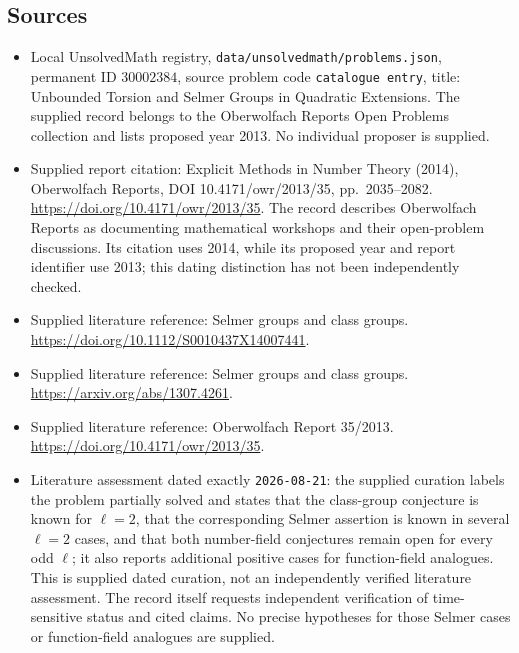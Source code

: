 \documentclass[11pt]{article}
\begin{document}
\subsection{Sources}
\begin{itemize}
\item Local UnsolvedMath registry, \texttt{data/unsolvedmath/problems.json}, permanent ID \(30002384\), source problem code \texttt{catalogue entry}, title: Unbounded Torsion and Selmer Groups in Quadratic Extensions. The supplied record belongs to the Oberwolfach Reports Open Problems collection and lists proposed year 2013. No individual proposer is supplied.
\item Supplied report citation: Explicit Methods in Number Theory (2014), Oberwolfach Reports, DOI 10.4171/owr/2013/35, pp.\ 2035--2082. \url{https://doi.org/10.4171/owr/2013/35}. The record describes Oberwolfach Reports as documenting mathematical workshops and their open-problem discussions. Its citation uses 2014, while its proposed year and report identifier use 2013; this dating distinction has not been independently checked.
\item Supplied literature reference: Selmer groups and class groups. \url{https://doi.org/10.1112/S0010437X14007441}.
\item Supplied literature reference: Selmer groups and class groups. \url{https://arxiv.org/abs/1307.4261}.
\item Supplied literature reference: Oberwolfach Report 35/2013. \url{https://doi.org/10.4171/owr/2013/35}.
\item Literature assessment dated exactly \texttt{2026-08-21}: the supplied curation labels the problem partially solved and states that the class-group conjecture is known for \(\ell=2\), that the corresponding Selmer assertion is known in several \(\ell=2\) cases, and that both number-field conjectures remain open for every odd \(\ell\); it also reports additional positive cases for function-field analogues. This is supplied dated curation, not an independently verified literature assessment. The record itself requests independent verification of time-sensitive status and cited claims. No precise hypotheses for those Selmer cases or function-field analogues are supplied.
\end{itemize}
\end{document}
